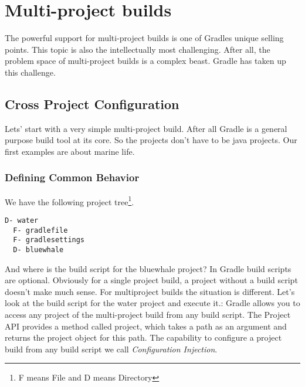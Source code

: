 \chapter{Multi-project builds} %
\label{cha:multi_project_builds}

The powerful support for multi-project builds is one of Gradles unique selling points. This topic is also the intellectually most challenging. After all, the problem space of multi-project builds is a complex beast. Gradle has taken up this challenge. 
\section{Cross Project Configuration} %
\label{sec:cross_project_configuration}
Lets' start with a very simple multi-project build. After all Gradle is a general purpose build tool at its core. So the projects don't have to be java projects. Our first examples are about marine life. 

\subsection{Defining Common Behavior} %
\label{sub:defining_common_behavior}

We have the following project tree\footnote{F means File and D means Directory}. 

\begin{minipage}[t]{7cm}
\begin{Verbatim}[frame=single,label=Project Tree]
D- water
  F- gradlefile
  F- gradlesettings
  D- bluewhale	
\end{Verbatim}
\end{minipage}	
\begin{minipage}[t]{9cm}
\end{minipage}

\noindent And where is the build script for the bluewhale project? In Gradle build scripts are optional. Obviously for a single project build, a project without a build script doesn't make much sense. For multiproject builds the situation is different. Let's look at the build script for the water project and execute it.:
Gradle allows you to access any project of the multi-project build from any build script. The Project API provides a method called project, which takes a path as an argument and returns the project object for this path. The capability to configure a project build from any build script we call \emph{Configuration Injection}.

